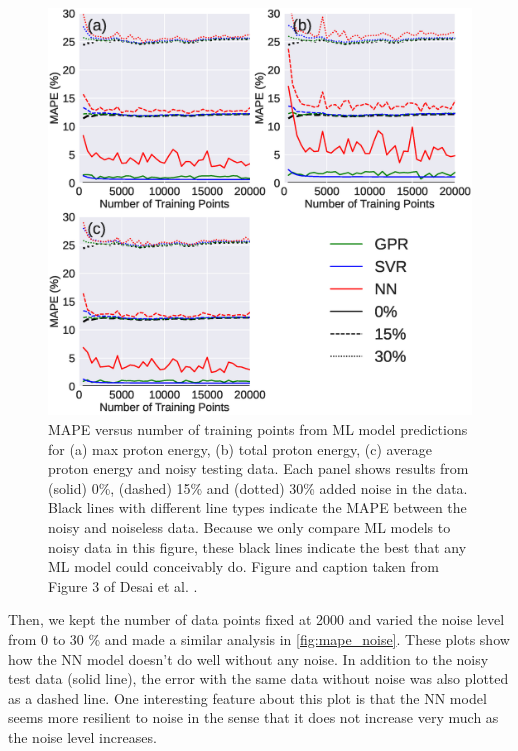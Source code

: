 \begin{figure}
	\centering 
	\includegraphics[width=0.75\linewidth]{planning/images/paper1/test_mape_3levels.eps}
	\caption{\gls{MAPE} versus number of training points from \gls{ML} model predictions for (a) max proton energy, (b) total proton energy, (c) average proton energy and noisy testing data. Each panel shows results from (solid) 0\%, (dashed) 15\% and (dotted) 30\% added noise in the data. Black lines with different line types indicate the \gls{MAPE} between the noisy and noiseless data. Because we only compare \gls{ML} models to noisy data in this figure, these black lines indicate the best that any \gls{ML} model could conceivably do. Figure and caption taken from Figure 3 of Desai et al. \cite{Desai_2024_CPP}.}
	\label{fig:mape_3levels}
\end{figure}

Then, we kept the number of data points fixed at 2000 and varied the noise level from 0 to 30 \% and made a similar analysis in \autoref{fig:mape_noise}. These plots show how the \gls{NN} model doesn't do well without any noise. In addition to the noisy test data (solid line), the error with the same data without noise was also plotted as a dashed line. One interesting feature about this plot is that the \gls{NN} model seems more resilient to noise in the sense that it does not increase very much as the noise level increases. 

